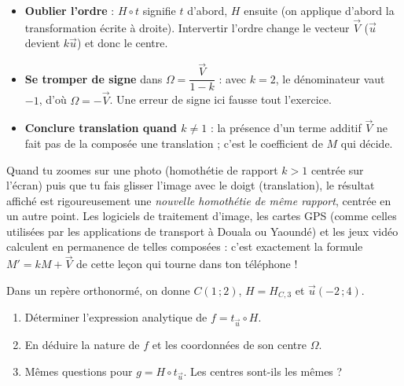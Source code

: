 \documentclass[11pt]{article}
\begin{document}
\begin{attention}
\begin{itemize}
\item \textbf{Oublier l'ordre} : $H\circ t$ signifie \og $t$ d'abord, $H$ ensuite \fg{} (on applique d'abord la transformation écrite à droite). Intervertir l'ordre change le vecteur $\vec{V}$ ($\vec{u}$ devient $k\vec{u}$) et donc le centre.
\item \textbf{Se tromper de signe} dans $\Omega = \dfrac{\vec{V}}{1-k}$ : avec $k = 2$, le dénominateur vaut $-1$, d'où $\Omega = -\vec{V}$. Une erreur de signe ici fausse tout l'exercice.
\item \textbf{Conclure \og translation \fg{} quand $k\neq 1$} : la présence d'un terme additif $\vec{V}$ ne fait pas de la composée une translation ; c'est le coefficient de $M$ qui décide.
\end{itemize}
\end{attention}

\begin{savaistu}
Quand tu zoomes sur une photo (homothétie de rapport $k>1$ centrée sur l'écran) puis que tu fais glisser l'image avec le doigt (translation), le résultat affiché est rigoureusement une \emph{nouvelle homothétie de même rapport}, centrée en un autre point. Les logiciels de traitement d'image, les cartes GPS (comme celles utilisées par les applications de transport à Douala ou Yaoundé) et les jeux vidéo calculent en permanence de telles composées : c'est exactement la formule $M' = kM + \vec{V}$ de cette leçon qui tourne dans ton téléphone !
\end{savaistu}

\begin{exercice}
Dans un repère orthonormé, on donne $C(1\,;2)$, $H = H_{C,3}$ et $\vec{u}(-2\,;4)$.
\begin{enumerate}
\item Déterminer l'expression analytique de $f = t_{\vec{u}}\circ H$.
\item En déduire la nature de $f$ et les coordonnées de son centre $\Omega$.
\item Mêmes questions pour $g = H\circ t_{\vec{u}}$. Les centres sont-ils les mêmes ?
\end{enumerate}
\end{exercice}
\end{document}

